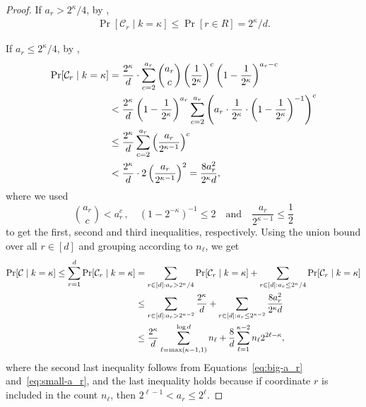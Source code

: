 \documentclass{toc}
\newcommand{\cC}{\ensuremath{\mathcal{C}}}
\begin{document}
\begin{proof}
If $a_r > 2^{\kappa}/4$, by ,
\begin{align}
\Pr[\cC_r \mid k = \kappa] \leq \Pr[r \in R] = 2^{\kappa}/d. \label{eq:big-a_r}
\end{align}

If $a_r \leq 2^{\kappa}/4$, by ,
\begin{align}
\Pr[\cC_r \mid k = \kappa] &= \frac{2^{\kappa}}{d}\cdot \sum\limits_{c = 2}^{a_r} \binom{a_r}{c} \left(\frac{1}{2^{\kappa}} \right)^c \left(1-\frac{1}{2^{\kappa}} \right)^{a_r-c} \notag \\
&< \frac{2^{\kappa}}{d} \left(1-\frac{1}{2^{\kappa}}\right)^{a_r} \sum_{c = 2}^{a_r} \left( a_r \cdot \frac{1}{2^{\kappa}} \cdot \left( 1-\frac{1}{2^{\kappa}} \right)^{-1} \right)^c  \notag \\
&\leq \frac{2^{\kappa}}{d} \sum_{c = 2}^{a_r} \left( \frac{a_r}{2^{\kappa-1}} \right)^c \notag \\
%
&< \frac{2^{\kappa}}{d} \cdot 2\left( \frac{a_r}{2^{\kappa-1}} \right)^2
= \frac{8a^2_r}{2^{\kappa} d}, \label{eq:small-a_r}
\end{align}
where we used
%
\[
  \binom{a_r}{c} < a_r^c \, , \quad (1 - 2^{-\kappa})^{-1} \leq
  2\quad\text{and}\quad \frac{a_r}{2^{\kappa-1}} \leq \frac{1}{2}
\]
%
%
to get the first, second and third inequalities, respectively.
%
Using
the   %
union bound over all $r \in [d]$ and grouping according to $n_\ell$,
we get
\begin{align}
\Pr[\cC \mid k = \kappa] \leq \sum_{r=1}^d \Pr[\cC_r \mid k = \kappa]
&= \sum_{r \in [d] : a_r > 2^\kappa/4} \Pr[\cC_r \mid k = \kappa] + \sum_{r \in [d]: a_r \leq 2^\kappa/4} \Pr[\cC_r \mid k = \kappa] \notag \\
&\leq \sum_{r \in [d] : a_r > 2^{\kappa-2}} \frac{2^{\kappa}}{d} + \sum_{r \in [d]: a_r \leq 2^{\kappa-2}} \frac{8a^2_r}{2^{\kappa} d} \notag \\
&\leq \frac{2^{\kappa}}{d} \sum\limits_{\ell = \max(\kappa - 1,1)}^{\log d} n_\ell + \frac{8}{d}  \sum_{\ell=1}^{\kappa-2} n_\ell 2^{2\ell - \kappa}, \label{eq:pr-c-k}
\end{align}
where the second last inequality follows from Equations~\eqref{eq:big-a_r} and~\eqref{eq:small-a_r}, and the last inequality holds because if coordinate $r$ is included in the count $n_\ell$, then $2^{\ell - 1} < a_r \leq 2^\ell$.


\end{proof}
\end{document}
